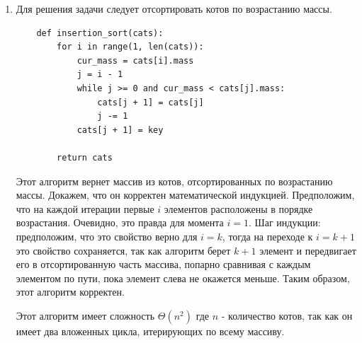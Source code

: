 \documentclass{article}
\begin{document}
\begin{enumerate}
          \[
              \begin{bmatrix}
                  F_{k} \\
                  F_{k-1}
              \end{bmatrix}
              =
              \begin{bmatrix}
                  1 & 1 \\
                  1 & 0
              \end{bmatrix}^{-1}
              \begin{bmatrix}
                  F_{k+1} \\
                  F_{k}
              \end{bmatrix}
              =
              \begin{bmatrix}
                  1 & 1 \\
                  1 & 0
              \end{bmatrix}^{k}
              \begin{bmatrix}
                  1 \\
                  0
              \end{bmatrix}
          \]
          То есть, даже для $k < 0$ данная формула применима

    \item Для решения задачи следует отсортировать котов по возрастанию массы.
          \begin{lstlisting}
    def insertion_sort(cats):
        for i in range(1, len(cats)):
            cur_mass = cats[i].mass
            j = i - 1
            while j >= 0 and cur_mass < cats[j].mass:
                cats[j + 1] = cats[j]
                j -= 1
            cats[j + 1] = key

        return cats
    \end{lstlisting}
          Этот алгоритм вернет массив из котов, отсортированных по возрастанию массы. Докажем, что он корректен математической индукцией. Предположим, что на каждой итерации первые $i$ элементов расположены в порядке возрастания. Очевидно, это правда для момента $i = 1$. Шаг индукции: предположим, что это свойство верно для $i = k$, тогда на переходе к $i = k + 1$ это свойство сохраняется, так как алгоритм берет $k + 1$ элемент и передвигает его в отсортированную часть массива, попарно сравнивая с каждым элементом по пути, пока элемент слева не окажется меньше. Таким образом, этот алгоритм корректен.

          Этот алгоритм имеет сложность $\Theta(n^2)$ где $n$ - количество котов, так как он имеет два вложенных цикла, итерирующих по всему массиву.


\end{enumerate}
\end{document}

